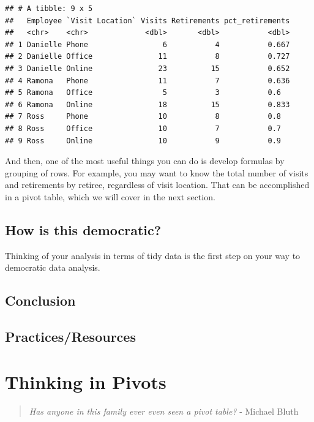 \documentclass[]{book}
\begin{document}
\begin{verbatim}
## # A tibble: 9 x 5
##   Employee `Visit Location` Visits Retirements pct_retirements
##   <chr>    <chr>             <dbl>       <dbl>           <dbl>
## 1 Danielle Phone                 6           4           0.667
## 2 Danielle Office               11           8           0.727
## 3 Danielle Online               23          15           0.652
## 4 Ramona   Phone                11           7           0.636
## 5 Ramona   Office                5           3           0.6  
## 6 Ramona   Online               18          15           0.833
## 7 Ross     Phone                10           8           0.8  
## 8 Ross     Office               10           7           0.7  
## 9 Ross     Online               10           9           0.9
\end{verbatim}

And then, one of the most useful things you can do is develop formulas by grouping of rows. For example, you may want to know the total number of visits and retirements by retiree, regardless of visit location. That can be accomplished in a pivot table, which we will cover in the next section.

\hypertarget{how-is-this-democratic}{%
\section{How is this democratic?}\label{how-is-this-democratic}}

Thinking of your analysis in terms of tidy data is the first step on your way to democratic data analysis.

\hypertarget{conclusion}{%
\section{Conclusion}\label{conclusion}}

\hypertarget{practicesresources}{%
\section{Practices/Resources}\label{practicesresources}}

\hypertarget{thinking-in-pivots}{%
\chapter{Thinking in Pivots}\label{thinking-in-pivots}}

\begin{quote}
\emph{Has anyone in this family ever even seen a pivot table?} - Michael Bluth
\end{quote}
\end{document}
